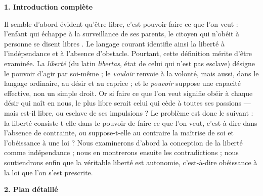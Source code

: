 \documentclass[11pt]{article}
\begin{document}
\begin{corrige}
\textbf{1. Introduction complète}

Il semble d'abord évident qu'être libre, c'est pouvoir faire ce que l'on veut : l'enfant qui échappe à la surveillance de ses parents, le citoyen qui n'obéit à personne se disent \guillemotleft libres \guillemotright. Le langage courant identifie ainsi la liberté à l'indépendance et à l'absence d'obstacle. Pourtant, cette définition mérite d'être examinée. La \emph{liberté} (du latin \emph{libertas}, état de celui qui n'est pas esclave) désigne le pouvoir d'agir par soi-même ; le \emph{vouloir} renvoie à la volonté, mais aussi, dans le langage ordinaire, au désir et au caprice ; et le \emph{pouvoir} suppose une capacité effective, non un simple droit. Or si \guillemotleft faire ce que l'on veut \guillemotright signifie obéir à chaque désir qui naît en nous, le plus \guillemotleft libre \guillemotright serait celui qui cède à toutes ses passions --- mais est-il libre, ou esclave de ses impulsions ? Le problème est donc le suivant : la liberté consiste-t-elle dans le pouvoir de faire ce que l'on veut, c'est-à-dire dans l'absence de contrainte, ou suppose-t-elle au contraire la maîtrise de soi et l'obéissance à une loi ? Nous examinerons d'abord la conception de la liberté comme indépendance ; nous en montrerons ensuite les contradictions ; nous soutiendrons enfin que la véritable liberté est autonomie, c'est-à-dire obéissance à la loi que l'on s'est prescrite.

\textbf{2. Plan détaillé}


\end{corrige}
\end{document}
